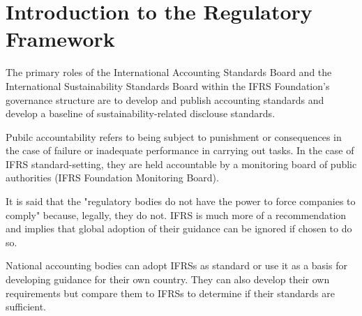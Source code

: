\section{Introduction to the Regulatory Framework}


The primary roles of the International Accounting Standards Board and the International Sustainability Standards Board within the IFRS Foundation's governance structure are to develop and publish accounting standards and develop a baseline of sustainability-related disclouse standards.

Pubilc accountability refers to being subject to punishment or consequences in the case of failure or inadequate performance in carrying out tasks. In the case of IFRS standard-setting, they are held accountable by a monitoring board of public authorities (IFRS Foundation Monitoring Board). 


It is said that the "regulatory bodies do not have the power to force companies to comply" because, legally, they do not. IFRS is much more of a recommendation and implies that global adoption of their guidance can be ignored if chosen to do so.  


National accounting bodies can adopt IFRSs as standard or use it as a basis for developing guidance for their own country. They can also develop their own requirements but compare them to IFRSs to determine if their standards are sufficient. 
